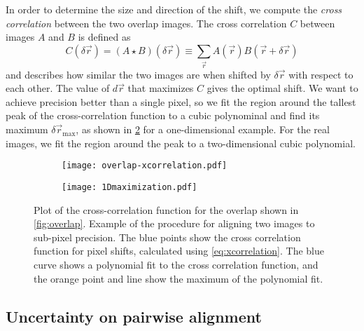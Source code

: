 \documentclass{article}
\begin{document}
In order to determine the size and direction of the shift, we compute the \emph{cross correlation} between the two overlap images.  The cross correlation $C$ between images $A$ and $B$ is defined as
\begin{equation}
C(\delta\vec{r})=(A\star B)(\delta\vec{r})\equiv\sum_{\vec{r}} {A(\vec{r})B(\vec{r}+\delta\vec{r})}
\label{eq:xcorrelation}
\end{equation}
and describes how similar the two images are when shifted by $\delta\vec{r}$ with respect to each other.  The value of $d\vec{r}$ that maximizes $C$ gives the optimal shift.  We want to achieve precision better than a single pixel, so we fit the region around the tallest peak of the cross-correlation function to a cubic polynominal and find its maximum $\delta\vec{r}_\text{max}$, as shown in \cref{fig:1Dmaximizationplot} for a one-dimensional example.  For the real images, we fit the region around the peak to a two-dimensional cubic polynomial.

\begin{figure}[ht]
	\centering
	\begin{subfigure}{0.45\linewidth}
	\texttt{[image: overlap-xcorrelation.pdf]}
	\caption{}
	\label{fig:xcorrelation}
	\end{subfigure}
	\begin{subfigure}{0.45\linewidth}
	\texttt{[image: 1Dmaximization.pdf]}
	\caption{}
	\label{fig:1Dmaximizationplot}
	\end{subfigure}
	\caption{
		 Plot of the cross-correlation function for the overlap shown in \cref{fig:overlap}.
		 Example of the procedure for aligning two images to sub-pixel precision.  The blue points show the cross correlation function for pixel shifts, calculated using \cref{eq:xcorrelation}.  The blue curve shows a polynomial fit to the cross correlation function, and the orange point and line show the maximum of the polynomial fit.
	}
	\label{fig:1Dmaximization}
\end{figure}

\subsection{Uncertainty on pairwise alignment}
\end{document}
